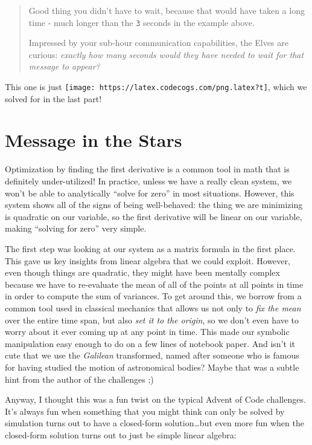 \documentclass[]{article}
\begin{document}
\begin{quote}
Good thing you didn't have to wait, because that would have taken a long time -
much longer than the \texttt{3} seconds in the example above.

Impressed by your sub-hour communication capabilities, the Elves are curious:
\emph{exactly how many seconds would they have needed to wait for that message
to appear?}
\end{quote}

This one is just \texttt{[image: https://latex.codecogs.com/png.latex?t]}, which
we solved for in the last part!

\hypertarget{message-in-the-stars}{%
\section{Message in the Stars}\label{message-in-the-stars}}

Optimization by finding the first derivative is a common tool in math that is
definitely under-utilized! In practice, unless we have a really clean system, we
won't be able to analytically ``solve for zero'' in most situations. However,
this system shows all of the signs of being well-behaved: the thing we are
minimizing is quadratic on our variable, so the first derivative will be linear
on our variable, making ``solving for zero'' very simple.

The first step was looking at our system as a matrix formula in the first place.
This gave us key insights from linear algebra that we could exploit. However,
even though things are quadratic, they might have been mentally complex because
we have to re-evaluate the mean of all of the points at all points in time in
order to compute the sum of variances. To get around this, we borrow from a
common tool used in classical mechanics that allows us not only to \emph{fix the
mean} over the entire time span, but also \emph{set it to the origin}, so we
don't even have to worry about it ever coming up at any point in time. This made
our symbolic manipulation easy enough to do on a few lines of notebook paper.
And isn't it cute that we use the \emph{Galilean} transformed, named after
someone who is famous for having studied the motion of astronomical bodies?
Maybe that was a subtle hint from the author of the challenges ;)

Anyway, I thought this was a fun twist on the typical Advent of Code challenges.
It's always fun when something that you might think can only be solved by
simulation turns out to have a closed-form solution\ldots{}but even more fun
when the closed-form solution turns out to just be simple linear algebra:
\end{document}
